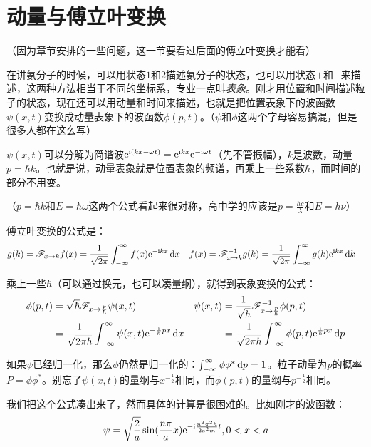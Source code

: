 \section{动量与傅立叶变换}
（因为章节安排的一些问题，这一节要看过后面的傅立叶变换才能看）

在讲氨分子的时候，可以用状态$1$和$2$描述氨分子的状态，也可以用状态$+$和$-$来描述，这两种方法相当于不同的坐标系，专业一点叫\emph{表象}。刚才用位置和时间描述粒子的状态，现在还可以用动量和时间来描述，也就是把位置表象下的波函数$\psi(x,t)$变换成动量表象下的波函数$\phi(p,t)$。（$\psi$和$\phi$这两个字母容易搞混，但是很多人都在这么写）

$\psi(x,t)$可以分解为简谐波$\mathrm{e}^{\mathrm{i}(k x-\omega t)}=\mathrm{e}^{\mathrm{i} k x} \mathrm{e}^{-\mathrm{i} \omega t}$（先不管振幅），$k$是波数，动量$p=\hbar k$。也就是说，动量表象就是位置表象的频谱，再乘上一些系数$\hbar$，而时间的部分不用变。

（$p=\hbar k$和$E=\hbar \omega$这两个公式看起来很对称，高中学的应该是$p=\frac{h c}{\lambda}$和$E=h \nu$）

傅立叶变换的公式是：
\begin{align*}
g(k)&=\mathscr{F}_{x \rightarrow k} f(x)=\frac{1}{\sqrt{2 \pi}} \int_{-\infty}^{\infty} f(x) \mathrm{e}^{-\mathrm{i} k x} \mathop{}\!\mathrm{d} x &
f(x)&=\mathscr{F}^{-1}_{x \rightarrow k} g(k)=\frac{1}{\sqrt{2 \pi}} \int_{-\infty}^{\infty} g(k) \mathrm{e}^{\mathrm{i} k x} \mathop{}\!\mathrm{d} k
\end{align*}

乘上一些$\hbar$（可以通过换元，也可以凑量纲），就得到表象变换的公式：
\begin{align*}
\phi(p,t)&=\sqrt{\hbar} \mathscr{F}_{x \rightarrow \frac{p}{\hbar}} \psi(x,t) & \psi(x,t)&=\frac{1}{\sqrt{\hbar}} \mathscr{F}^{-1}_{x \rightarrow \frac{p}{\hbar}} \phi(p,t) \\
&=\frac{1}{\sqrt{2 \pi \hbar}} \int_{-\infty}^{\infty} \psi(x,t) \mathrm{e}^{-\frac{\mathrm{i}}{\hbar} p x} \mathop{}\!\mathrm{d} x & &=\frac{1}{\sqrt{2 \pi \hbar}} \int_{-\infty}^{\infty} \phi(p,t) \mathrm{e}^{\frac{\mathrm{i}}{\hbar} p x} \mathop{}\!\mathrm{d} p
\end{align*}

如果$\psi$已经归一化，那么$\phi$仍然是归一化的：$\int_{-\infty}^{\infty} \phi \phi^* \mathop{}\!\mathrm{d} p=1$。粒子动量为$p$的概率$P=\phi \phi^*$。别忘了$\psi(x,t)$的量纲与$x^{-\frac{1}{2}}$相同，而$\phi(p,t)$的量纲与$p^{-\frac{1}{2}}$相同。

我们把这个公式凑出来了，然而具体的计算是很困难的。比如刚才的波函数：
\begin{equation*}
\psi=\sqrt{\frac{2}{a}} \sin(\frac{n \pi}{a} x) \mathrm{e}^{-\mathrm{i} \frac{n^2 \pi^2 \hbar}{2 a^2 m} t}, 0<x<a
\end{equation*}

